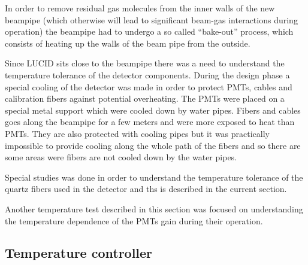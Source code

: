 In order to remove residual gas molecules from the inner walls of the new beampipe (which otherwise will lead to significant beam-gas interactions during operation)
the beampipe had to undergo a so called ``bake-out'' process, which consists of heating up the walls of the beam pipe from the outside.

Since LUCID sits close to the beampipe there was a need to understand the temperature tolerance of the detector components.
During the design phase a special cooling of the detector was made in order to protect PMTs, cables and calibration fibers against potential overheating.
The PMTs were placed on a special metal support which were cooled down by water pipes.
Fibers and cables goes along the beampipe for a few meters and were more exposed to heat than PMTs.
They are also protected with cooling pipes but it was practically impossible to provide cooling along the whole path of the fibers 
and so there are some areas were fibers are not cooled down by the water pipes.

Special studies was done in order to understand the temperature tolerance of the quartz fibers used in the detector and ths is described in the current section.


Another temperature test described in this section was focused on understanding the temperature dependence of the PMTs gain during their operation.

\subsection{Temperature controller}
\label{subsec:tempController}

